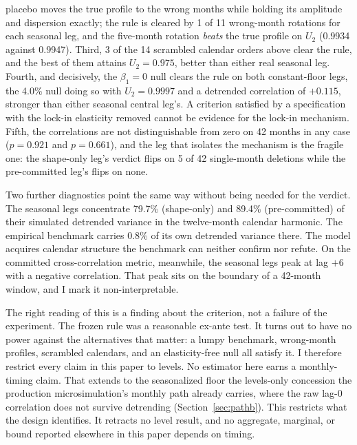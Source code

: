 \documentclass[12pt]{article}
\begin{document}
placebo moves the true profile to the wrong months while holding its amplitude and dispersion exactly; the rule is cleared by 1 of 11 wrong-month rotations for each seasonal leg, and the five-month rotation \emph{beats} the true profile on $U_2$ (0.9934 against 0.9947). Third, 3 of the 14 scrambled calendar orders above clear the rule, and the best of them attains $U_2 = 0.975$, better than either real seasonal leg. Fourth, and decisively, the $\beta_1 = 0$ null clears the rule on both constant-floor legs, the 4.0\% null doing so with $U_2 = 0.9997$ and a detrended correlation of $+0.115$, stronger than either seasonal central leg's. A criterion satisfied by a specification with the lock-in elasticity removed cannot be evidence for the lock-in mechanism. Fifth, the correlations are not distinguishable from zero on 42 months in any case ($p = 0.921$ and $p = 0.661$), and the leg that isolates the mechanism is the fragile one: the shape-only leg's verdict flips on 5 of 42 single-month deletions while the pre-committed leg's flips on none.

Two further diagnostics point the same way without being needed for the verdict. The seasonal legs concentrate 79.7\% (shape-only) and 89.4\% (pre-committed) of their simulated detrended variance in the twelve-month calendar harmonic. The empirical benchmark carries 0.8\% of its own detrended variance there. The model acquires calendar structure the benchmark can neither confirm nor refute. On the committed cross-correlation metric, meanwhile, the seasonal legs peak at lag $+6$ with a negative correlation. That peak sits on the boundary of a 42-month window, and I mark it non-interpretable.

The right reading of this is a finding about the criterion, not a failure of the experiment. The frozen rule was a reasonable ex-ante test. It turns out to have no power against the alternatives that matter: a lumpy benchmark, wrong-month profiles, scrambled calendars, and an elasticity-free null all satisfy it. I therefore restrict every claim in this paper to levels. No estimator here earns a monthly-timing claim. That extends to the seasonalized floor the levels-only concession the production microsimulation's monthly path already carries, where the raw lag-0 correlation does not survive detrending (Section~\ref{sec:pathb}). This restricts what the design identifies. It retracts no level result, and no aggregate, marginal, or bound reported elsewhere in this paper depends on timing.
\end{document}
